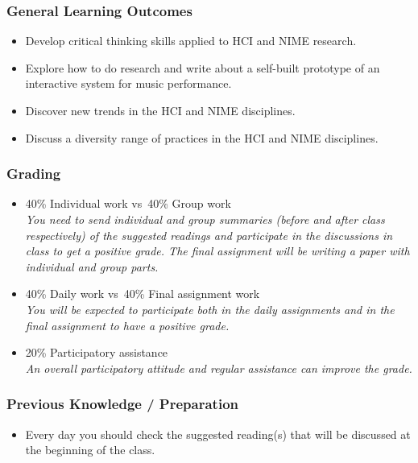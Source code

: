 \documentclass[screen, aspectratio=43]{beamer}
\begin{document}
%
\begin{frame}
\frametitle{General Learning Outcomes}
\begin{itemize}
\item Develop critical thinking skills applied to HCI and NIME research.
\item Explore how to do research and write about a self-built prototype of an interactive system for music performance.
\item Discover new trends in the HCI and NIME disciplines.
\item Discuss a diversity range of practices in the HCI and NIME disciplines.
\end{itemize}
\end{frame}
%
\begin{frame}
\frametitle{Grading}
\begin{itemize}
\item 40\% Individual work vs\ 40\% Group work\\
\emph{You need to send individual and group summaries (before and after class respectively) of the suggested readings and participate in the discussions in class to get a positive grade. The final assignment will be writing a paper with individual and group parts.}
\item 40\% Daily work vs\ 40\% Final assignment work\\
\emph{You will be expected to participate both in the daily assignments and in the final assignment to have a positive grade.}
\item 20\% Participatory assistance\\
\emph{An overall participatory attitude and regular assistance can improve the grade.}
\end{itemize}
\end{frame}
%
\begin{frame}
\frametitle{Previous Knowledge / Preparation}
\begin{itemize}
\item Every day you should check the suggested reading(s) that will be discussed at the beginning of the class.
\end{itemize}
\end{frame}
%
\end{document}
